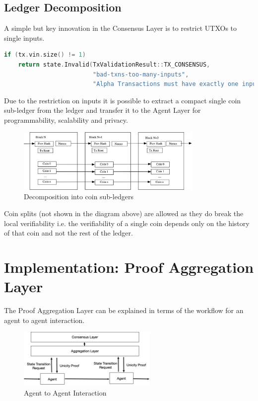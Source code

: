 \documentclass{article}
\begin{document}
\subsection*{Ledger Decomposition}


A simple but key innovation in the Consensus Layer is to restrict UTXOs to single inputs.

\begin{center}
\begin{lstlisting}[language=C++, linewidth=0.8\textwidth]
if (tx.vin.size() != 1)
    return state.Invalid(TxValidationResult::TX_CONSENSUS, 
                         "bad-txns-too-many-inputs", 
                         "Alpha Transactions must have exactly one input");
\end{lstlisting}
\end{center}

 Due to the restriction on inputs it is possible to extract a compact single coin sub-ledger from the ledger and transfer it to the Agent Layer for programmability, scalability and privacy. 
 
\begin{figure}[H]
    \centering
    \includegraphics[width=0.8\textwidth]{CoinLedger.png}
    \caption{Decomposition into coin sub-ledgers}
    \label{fig:coinledger}
\end{figure}
\vspace{2mm}

Coin splits (not shown in the diagram above) are allowed as they do break the local verifiability i.e. the verifiability of a single coin depends only on the history of that coin and not the rest of the ledger.


\section{Implementation: Proof Aggregation Layer}

The Proof Aggregation Layer can be explained in terms of the workflow for an agent to agent interaction. 

\begin{figure}[H]
    \centering
    \includegraphics[width=0.6\textwidth]{Workflow.png}
    \caption{Agent to Agent Interaction}
    \label{fig:Workflow}
\end{figure}
\end{document}
